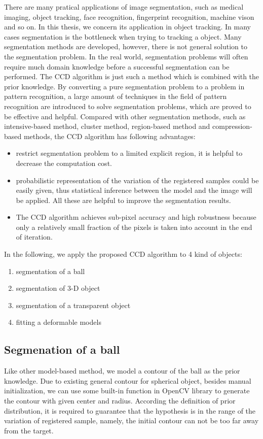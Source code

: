There are many pratical
applications of image segmentation, such as medical imaging, object
tracking, face recognition, fingerprint recognition, machine vison and
so on. In this thesis, we concern its application in object tracking.
In many cases segmentation is the bottleneck when trying to tracking a
object. Many segmentation methods are developed, however, there is not
general solution to the segmentation problem. In the real world,
segmentation problems will often require much domain knowledge before
a successful segmentation can be performed. The CCD algorithm is just
such a method which is combined with the prior knowledge. By
converting a pure segmentation problem to a problem in pattern
recognition, a large amount of techniques in the field of pattern
recognition are introduced to solve segmentation problems, which are
proved to be effective and helpful. Compared with other segmentation
methods, such as intensive-based method,  cluster method, region-based
method and compression-based methods, the CCD algorithm has following
advantages:
\begin{itemize}
\item restrict segmentation problem to a limited explicit region, it is helpful
  to decrease the computation cost.
\item probabilistic representation of the variation of the registered
  samples could be easily given, thus statistical inference between
  the model and the image will be applied. All these are helpful to
  improve the segmentation results.
\item The CCD algorithm achieves sub-pixel accuracy and high
  robustness because only a relatively small fraction of the pixels is
  taken into account in the end of iteration.
\end{itemize}

In the following, we apply the proposed CCD algorithm to 4 kind of
objects:
\begin{enumerate}
\item segmentation of a ball
\item segmentation of 3-D object
\item segmentation of a transparent object
\item fitting a deformable models
\end{enumerate}

\subsection{Segmenation of a ball}
\label{sec:sb}
Like other model-based method, we model a contour of the ball as the
prior knowledge. Due to existing general contour for spherical object,
besides manual initialization, we can use some built-in function in
OpenCV library to generate the contour with given center and
radius. According the definition of prior distribution, it is required
to guarantee that the hypothesis is in the range of the variation of
registered sample, namely, the initial contour can not be too far away
from the target.

